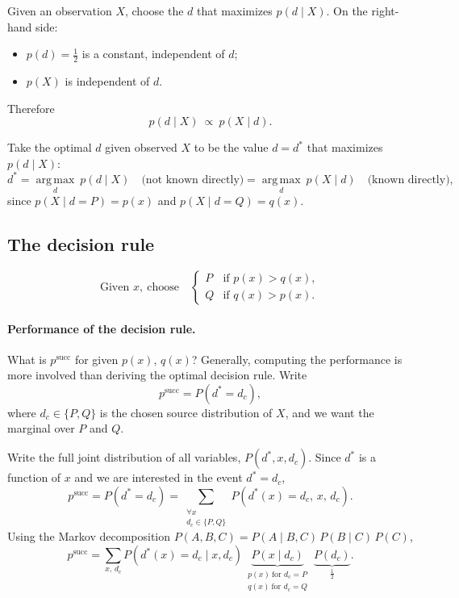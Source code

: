 \documentclass[11pt]{article}
\newcommand{\argmax}{\operatorname*{arg\,max}}
\begin{document}
Given an observation $X$, choose the $d$ that maximizes $p(d\mid X)$. On the
right-hand side:
\begin{itemize}[nosep]
  \item $p(d)=\tfrac12$ is a constant, independent of $d$;
  \item $p(X)$ is independent of $d$.
\end{itemize}
Therefore
\[
p(d\mid X)\ \propto\ p(X\mid d).
\]

Take the optimal $d$ given observed $X$ to be the value $d=d^{*}$ that
maximizes $p(d\mid X)$:
\[
d^{*}
= \argmax_{d}\ p(d\mid X)
\quad\text{(not known directly)}
= \argmax_{d}\ p(X\mid d)
\quad\text{(known directly),}
\]
since $p(X\mid d=P)=p(x)$ and $p(X\mid d=Q)=q(x)$.

\subsection{The decision rule}

\[
\text{Given } x,\ \text{choose}\quad
\begin{cases}
P & \text{if } p(x) > q(x),\\[2pt]
Q & \text{if } q(x) > p(x).
\end{cases}
\]

\paragraph{Performance of the decision rule.}
What is $p^{\mathrm{succ}}$ for given $p(x),\,q(x)$? Generally, computing the
performance is more involved than deriving the optimal decision rule. Write
\[
p^{\mathrm{succ}} = P(d^{*}=d_{c}),
\]
where $d_{c}\in\{P,Q\}$ is the chosen source distribution of $X$, and we want
the marginal over $P$ and $Q$.

Write the full joint distribution of all variables, $P(d^{*},x,d_{c})$. Since
$d^{*}$ is a function of $x$ and we are interested in the event $d^{*}=d_{c}$,
\[
p^{\mathrm{succ}} = P(d^{*}=d_{c})
= \sum_{\substack{\forall x\\ d_{c}\in\{P,Q\}}}
P\!\left(d^{*}(x)=d_{c},\,x,\,d_{c}\right).
\]
Using the Markov decomposition $P(A,B,C)=P(A\mid B,C)\,P(B\mid C)\,P(C)$,
\[
p^{\mathrm{succ}}
= \sum_{x,\,d_{c}}
P\!\left(d^{*}(x)=d_{c}\mid x,d_{c}\right)\,
\underbrace{P(x\mid d_{c})}_{\substack{p(x)\ \text{for } d_{c}=P\\ q(x)\ \text{for } d_{c}=Q}}\;
\underbrace{P(d_{c})}_{\tfrac12}.
\]
\end{document}
